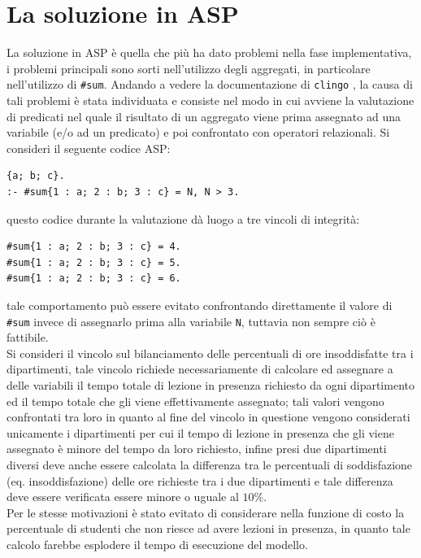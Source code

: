 \documentclass[12pt, italian, openany]{book}
\begin{document}
\chapter{La soluzione in ASP}
La soluzione in ASP è quella che più ha dato problemi nella fase implementativa, i problemi principali sono sorti nell'utilizzo degli aggregati, in particolare nell'utilizzo di \texttt{\#sum}. Andando a vedere la documentazione di \texttt{clingo} \cite{DBLP:journals/corr/GebserKKS14}, la causa di tali problemi è stata individuata e consiste nel modo in cui avviene la valutazione di predicati nel quale il risultato di un aggregato viene prima assegnato ad una variabile (e/o ad un predicato) e poi confrontato con operatori relazionali. Si consideri il seguente codice ASP:

\begin{lstlisting}[style=aspstyle]
{a; b; c}.
:- #sum{1 : a; 2 : b; 3 : c} = N, N > 3.
\end{lstlisting}
questo codice durante la valutazione dà luogo a tre vincoli di integrità:
\begin{lstlisting}[style=aspstyle]
#sum{1 : a; 2 : b; 3 : c} = 4.
#sum{1 : a; 2 : b; 3 : c} = 5.
#sum{1 : a; 2 : b; 3 : c} = 6.
\end{lstlisting}
tale comportamento può essere evitato confrontando direttamente il valore di \texttt{\#sum} invece di assegnarlo prima alla variabile \texttt{N}, tuttavia non sempre ciò è fattibile.\\
Si consideri il vincolo sul bilanciamento delle percentuali di ore insoddisfatte tra i dipartimenti, tale vincolo richiede necessariamente di calcolare ed assegnare a delle variabili il tempo totale di lezione in presenza richiesto da ogni dipartimento ed il tempo totale che gli viene effettivamente assegnato; tali valori vengono confrontati tra loro in quanto al fine del vincolo in questione vengono considerati unicamente i dipartimenti per cui il tempo di lezione in presenza che gli viene assegnato è minore del tempo da loro richiesto, infine presi due dipartimenti diversi deve anche essere calcolata la differenza tra le percentuali di soddisfazione (eq. insoddisfazione) delle ore richieste tra i due dipartimenti e tale differenza deve essere verificata essere minore o uguale al $10\%$. \\
Per le stesse motivazioni è stato evitato di considerare nella funzione di costo la percentuale di studenti che non riesce ad avere lezioni in presenza, in quanto tale calcolo farebbe esplodere il tempo di esecuzione del modello.
\end{document}
